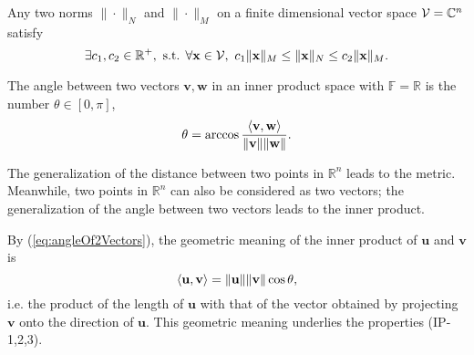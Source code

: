\begin{thm}
  \label{thm:normEquivalence}
  Any two norms $\|\cdot\|_N$ and $\|\cdot\|_M$
  on a finite dimensional vector space
  ${\cal V}=\mathbb{C}^n$ satisfy
  \begin{equation}
    \label{eq:normEquivalence}
    \exists c_1,c_2\in \mathbb{R}^+,
    \textrm{ s.t. } \forall\mathbf{x}\in {\cal V}, \ 
    c_1\|\mathbf{x}\|_M \le \|\mathbf{x}\|_N \le c_2\|\mathbf{x}\|_M.
  \end{equation}
\end{thm}

\begin{defn}
  \label{def:angle}
  The angle between two vectors $\mathbf{v},\mathbf{w}$
  in an inner product space with $\mathbb{F}=\mathbb{R}$
  is the number $\theta\in [0,\pi]$, 
  \begin{equation}
    \label{eq:angleOf2Vectors}
    \theta = \arccos \frac{\left\langle \mathbf{v}, \mathbf{w} \right\rangle}
    {\|\mathbf{v}\|\|\mathbf{w}\|}.
  \end{equation}
\end{defn}

\begin{rem}
  The generalization of the distance
  between two points in $\mathbb{R}^n$ leads to the metric.
  Meanwhile, two points in $\mathbb{R}^n$
  can also be considered as two vectors; 
  the generalization of the angle between two vectors
  leads to the inner product.
\end{rem}


\begin{rem}
  By (\ref{eq:angleOf2Vectors}),
  the geometric meaning of the inner product of $\mathbf{u}$
  and $\mathbf{v}$ is   
  \begin{displaymath}
    \left\langle \mathbf{u},\mathbf{v} \right\rangle = \|\mathbf{u}\| \|\mathbf{v}\|
    \cos\theta, 
  \end{displaymath}
  i.e. the product of the length of $\mathbf{u}$
  with that of the vector obtained by projecting $\mathbf{v}$
  onto the direction of $\mathbf{u}$.
  This geometric meaning underlies the properties
  (IP-1,2,3).
\end{rem}

